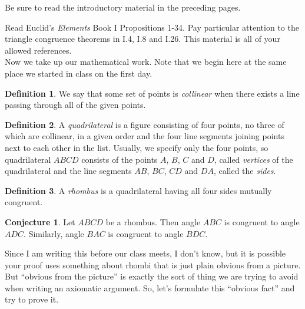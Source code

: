 \documentclass{tufte-handout}
\theoremstyle{definition}
\newtheorem{conjecture}[problem]{Conjecture}
\newtheorem*{definition}{Definition}
\begin{document}
Be sure to read the introductory material in the preceding pages.\\


Read Euclid's \emph{Elements} Book I Propositions 1-34.
Pay particular attention to the triangle congruence theorems in I.4, I.8 and I.26.
This material is all of your allowed references.\\

Now we take up our mathematical work. Note that we begin here at the same place we started in class on the first day.

\begin{definition}\label{defn:collinear}
We say that some set of points is \emph{collinear} when there exists a line passing through all of the given points.
\end{definition}


\begin{definition}\label{defn:quadrilateral}
A \emph{quadrilateral} is a figure consisting of four points, no three of which are collinear, in a given order and the four line segments joining points next to each other in the list.
Usually, we specify only the four points, so quadrilateral $ABCD$ consists of the points $A$, $B$, $C$ and $D$, called \emph{vertices} of the quadrilateral and the line segments $AB$, $BC$, $CD$ and $DA$, called the \emph{sides}.
\end{definition}

\begin{definition}\label{defn:rhombus}
A \emph{rhombus} is a quadrilateral having all four sides mutually congruent.
\end{definition}

\begin{conjecture}\label{conj:rhombus-angles}
Let $ABCD$ be a rhombus. Then angle $ABC$ is congruent to angle $ADC$. Similarly, angle $BAC$ is congruent to angle $BDC$.
\end{conjecture}



Since I am writing this before our class meets, I don't know, but it is possible your proof uses something about rhombi that is just plain obvious from a picture.
But ``obvious from the picture'' is exactly the sort of thing we are trying to avoid when writing an axiomatic argument.
So, let's formulate this ``obvious fact'' and try to prove it.
\end{document}
